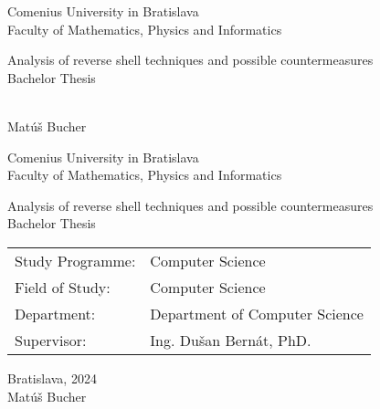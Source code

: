 \documentclass[12pt, twoside]{book}
\def\mfrok{2024}
\def\mfnazov{Analysis of reverse shell techniques and possible countermeasures}
\def\mftyp{Bachelor Thesis}
\def\mfautor{Matúš Bucher}
\def\mfskolitel{Ing. Dušan Bernát, PhD.}
\def\mfmiesto{Bratislava, \mfrok}
\def\mfodbor{Computer Science}
\def\program{Computer Science }
\def\mfpracovisko{ Department of Computer Science }
\begin{document}
\frontmatter
\pagestyle{empty}


\begin{center}
  \sc\large
  Comenius University in Bratislava\\
  Faculty of Mathematics, Physics and Informatics

\vfill

{\LARGE\mfnazov}\\
\mftyp
\end{center}

\vfill

{\sc\large 
\noindent \mfrok\\
\mfautor
}

\cleardoublepage


\noindent

\begin{center}
\sc  
\large
  Comenius University in Bratislava\\
  Faculty of Mathematics, Physics and Informatics

\vfill

{\LARGE\mfnazov}\\
\mftyp
\end{center}

\vfill

\noindent
\begin{tabular}{ll}
Study Programme: & \program \\
Field of Study: & \mfodbor \\
Department: & \mfpracovisko \\
Supervisor: & \mfskolitel \\
\end{tabular}

\vfill


\noindent \mfmiesto\\
\mfautor

\cleardoublepage



\newpage
\setcounter{page}{3}



\end{document}

